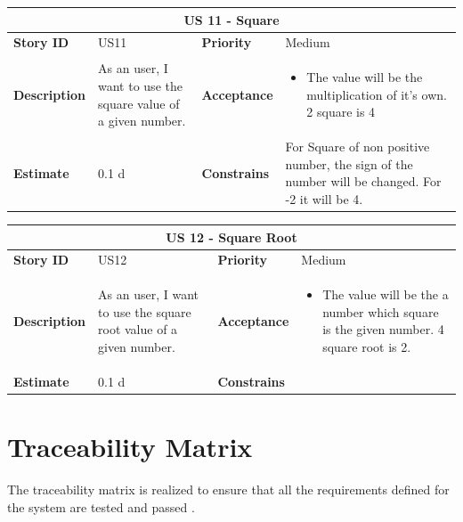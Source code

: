 \documentclass{article}
\begin{document}
\begin{tabular}{ |p{2cm}|p{5cm}|p{2cm}|p{4cm}| }
 \hline
 \multicolumn{4}{|c|}{US 11 -  Square} \\
 \hline
 \textbf {Story ID}& US11 &  \textbf{Priority} & Medium \\
 \hline
  \textbf{Description}   & As an user, I want to use the square value of a given number. &    \textbf{Acceptance}& 
\begin{itemize}
\item  The value will be the multiplication of it's own. 2 square is 4
\end{itemize}
  \\
 \hline
 \textbf{Estimate} & 0.1 d &  \textbf{Constrains}&  For Square of non positive number, the sign of the number will be changed. For -2 it will be 4.  \\
 \hline
\end{tabular}

\begin{tabular}{ |p{2cm}|p{5cm}|p{2cm}|p{4cm}| }
 \hline
 \multicolumn{4}{|c|}{US 12 -  Square Root} \\
 \hline
 \textbf {Story ID}& US12 &  \textbf{Priority} & Medium \\
 \hline
  \textbf{Description}   & As an user, I want to use the square root value of a given number. &    \textbf{Acceptance}& 
\begin{itemize}
\item  The value will be the a number which square is the given number. 4 square root is 2.  
\end{itemize}
  \\
 \hline
 \textbf{Estimate} & 0.1 d &  \textbf{Constrains}&    \\
 \hline
\end{tabular}

\section{Traceability Matrix}

The traceability matrix is realized to ensure that all the requirements defined for the system are tested and passed \cite{prev_project}.\newline
\end{document}
